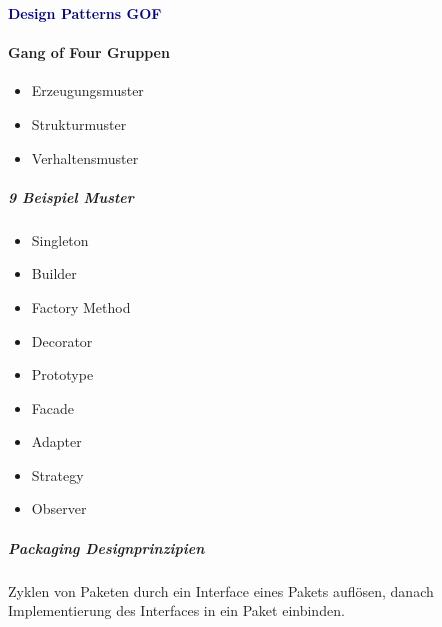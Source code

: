 \textbf{\textcolor{darkblue}{Design Patterns GOF}}~
\paragraph{Gang of Four Gruppen}
\begin{itemize}
	\item Erzeugungsmuster
	\item Strukturmuster
	\item Verhaltensmuster
\end{itemize}

\subparagraph{9 Beispiel Muster}
\begin{itemize}
	\item Singleton
	\item Builder
	\item Factory Method
	\item Decorator
	\item Prototype
	\item Facade
	\item Adapter
	\item Strategy
	\item Observer
\end{itemize}

\subparagraph{Packaging Designprinzipien}
Zyklen von Paketen durch ein Interface eines Pakets auflösen, 
danach Implementierung des Interfaces in ein Paket einbinden.


